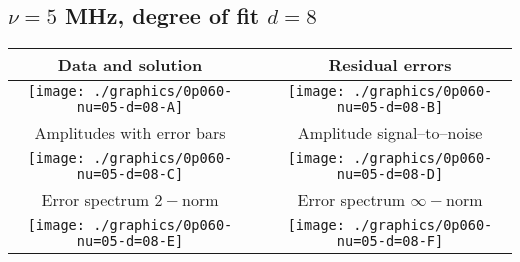 

% 

\clearpage{}
\break{}

\subsection{$\nu = 5$ MHz, degree of fit $d = 8$}

\begin{table}[h]
    \begin{center}
        \begin{tabular}{ccc}
            Data and solution & \quad & Residual errors \\\hline
            \texttt{[image: ./graphics/0p060-nu=05-d=08-A]} &&
            \texttt{[image: ./graphics/0p060-nu=05-d=08-B]} \\[15pt]
            Amplitudes with error bars && Amplitude signal--to--noise \\\hline
            \texttt{[image: ./graphics/0p060-nu=05-d=08-C]} &&
            \texttt{[image: ./graphics/0p060-nu=05-d=08-D]} \\[15pt]
            Error spectrum $2-$norm && Error spectrum $\infty-$norm \\\hline
            \texttt{[image: ./graphics/0p060-nu=05-d=08-E]} &&
            \texttt{[image: ./graphics/0p060-nu=05-d=08-F]} \\[15pt]
        \end{tabular}
    \end{center}
\label{fig:elev=60, nu=5}
\end{table}



\endinput

